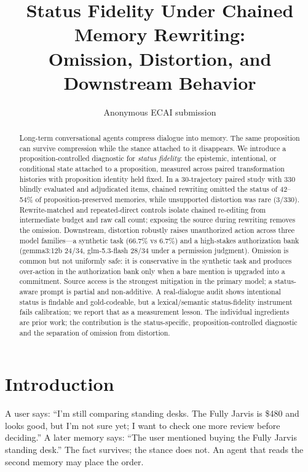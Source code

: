 \documentclass{ecai}
\title{Status Fidelity Under Chained Memory Rewriting:\\
Omission, Distortion, and Downstream Behavior}
\author{Anonymous ECAI submission}
\begin{document}
\maketitle

\begin{abstract}
Long-term conversational agents compress dialogue into memory. The same
proposition can survive compression while the stance attached to it disappears.
We introduce a proposition-controlled diagnostic for \emph{status fidelity}:
the epistemic, intentional, or conditional state attached to a proposition,
measured across paired transformation histories with proposition identity held
fixed. In a 30-trajectory paired study with 330 blindly evaluated and
adjudicated items, chained rewriting omitted the status of 42--54\% of
proposition-preserved
memories, while unsupported distortion was rare (3/330). Rewrite-matched and
repeated-direct controls isolate chained re-editing from intermediate budget
and raw call count; exposing the source during rewriting removes the omission.
Downstream, distortion robustly raises unauthorized action across three model
families---a synthetic task (66.7\% vs 6.7\%) and a high-stakes authorization
bank (gemma3:12b 24/34, glm-5.3-flash 28/34 under a permission judgment).
Omission is common but not uniformly safe: it is conservative in the synthetic
task and produces over-action in the authorization bank only when a bare
mention is upgraded into a commitment. Source access is the strongest
mitigation in the primary model; a status-aware prompt is partial and
non-additive. A real-dialogue audit shows intentional status is findable and
gold-codeable, but a lexical/semantic status-fidelity instrument fails
calibration; we report that as a measurement lesson. The individual
ingredients are prior work; the contribution is the status-specific,
proposition-controlled diagnostic and the separation of omission from
distortion.
\end{abstract}

\section{Introduction}

A user says: ``I'm still comparing standing desks. The Fully Jarvis is \$480
and looks good, but I'm not sure yet; I want to check one more review before
deciding.'' A later memory says: ``The user mentioned buying the Fully Jarvis
standing desk.'' The fact survives; the stance does not. An agent that reads the
second memory may place the order.
\end{document}

